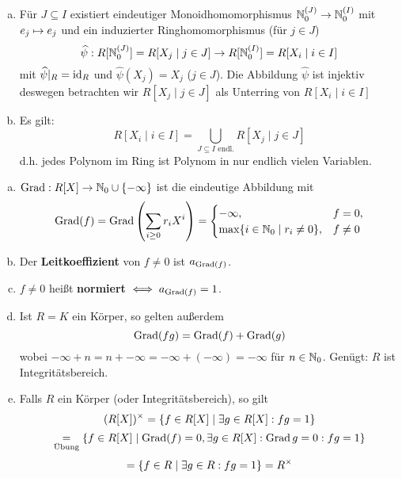 \documentclass[a4paper]{report}
\begin{document}
\begin{facts*}\item
\begin{enumerate}[(a)]
  \item Für $J \subseteq I$ existiert eindeutiger Monoidhomomorphismus $\Nn^{(J)} \to \Nn^{(I)}$ mit $e_{j} \mps e_{j}$ und ein induzierter Ringhomomorphismus (für $j \in J$) \[\hat \psi: R[\Nn^{(J)}] = R[X_{j} \mid j \in J] \to R[\Nn^{(I)}] = R[X_{i} \mid i \in I]\]
        mit $\hat \psi|_{R} = \id_{R}$ und $\hat \psi (X_{j}) = X_{j}$ ($j \in J$). Die Abbildung $\hat \psi$ ist injektiv deswegen betrachten wir $R[X_{j} \mid j \in J]$ als Unterring von $R[X_{i} \mid i \in I]$
  \item Es gilt: \[R[X_{i} \mid i \in I] = \bigcup_{J \subseteq I \text{ endl.}} R[X_{j} \mid j \in J]\]
        d.h. jedes Polynom im Ring ist Polynom in nur endlich vielen Variablen.
\end{enumerate}
\end{facts*}

\begin{defi}\item
\begin{enumerate}[(a)]
  \item $\grad : R[X] \to \Nn \cup \{- \infty\}$ ist die eindeutige Abbildung mit
        \[\grad(f) = \grad\l( \sum_{i \ge 0}r_{i}X^{i} \r) = \begin{cases} -\infty, & f = 0, \\
                                                          \max\{i \in \Nn \mid r_{i} \ne 0\}, & f \ne 0
                                                        \end{cases}\]
  \item Der \textbf{Leitkoeffizient} von $f \ne 0$ ist $a_{\grad(f)}$.
  \item $f \ne 0$ heißt \textbf{normiert} $\iff a_{\grad(f)} = 1$.
  \item Ist $R = K$ ein Körper, so gelten außerdem
        \[\grad(fg) = \grad(f) + \grad(g)\]
        wobei $-\infty + n = n + -\infty = - \infty + (- \infty) = - \infty$ für $n \in \Nn$. Genügt: $R$ ist Integritätsbereich.
  \item Falls $R$ ein Körper (oder Integritätsbereich), so gilt
        \[(R[X])\en = \{f \in R[X] \mid \ex g \in R[X] : fg = 1\}\]
        \[\ueb = \{f \in R[X] \mid \grad(f) = 0, \ex g \in R[X] : \grad g = 0 : fg = 1\} \]
        \[ = \{f \in R \mid \ex g \in R : fg = 1\} = R\en\]
\end{enumerate}
\end{defi}
\end{document}
